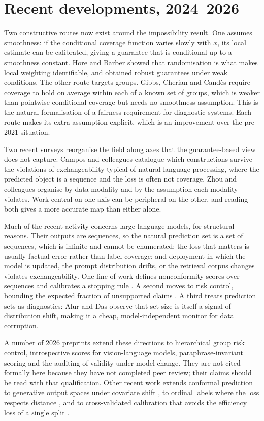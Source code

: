\section{Recent developments, 2024--2026}

Two constructive routes now exist around the impossibility result. One assumes
smoothness: if the conditional coverage function varies slowly with $x$, its local
estimate can be calibrated, giving a guarantee that is conditional up to a
smoothness constant. Hore and Barber \cite{Hore2024} showed that randomisation is
what makes local weighting identifiable, and obtained robust guarantees under weak
conditions. The other route targets groups. Gibbs, Cherian and Candès
\cite{Gibbs2025} require coverage to hold on average within each of a known set of
groups, which is weaker than pointwise conditional coverage but needs no
smoothness assumption. This is the natural formalisation of a fairness requirement
for diagnostic systems. Each route makes its extra assumption explicit, which is
an improvement over the pre-2021 situation.

Two recent surveys reorganise the field along axes that the guarantee-based view
does not capture. Campos and colleagues \cite{Campos2024} catalogue which
constructions survive the violations of exchangeability typical of natural
language processing, where the predicted object is a sequence and the loss is
often not coverage. Zhou and colleagues \cite{Zhou2025} organise by data modality
and by the assumption each modality violates. Work central on one axis can be
peripheral on the other, and reading both gives a more accurate map than either
alone.

Much of the recent activity concerns large language models, for structural reasons.
Their outputs are sequences, so the natural prediction set is a set of sequences,
which is infinite and cannot be enumerated; the loss that matters is usually
factual error rather than label coverage; and deployment in which the model is
updated, the prompt distribution drifts, or the retrieval corpus changes violates
exchangeability. One line of work defines nonconformity scores over sequences and
calibrates a stopping rule \cite{ConformalLM}. A second moves to risk control,
bounding the expected fraction of unsupported claims \cite{CRC}. A third treats
prediction sets as diagnostics: Alur and Das \cite{Alur2026} observe that set size
is itself a signal of distribution shift, making it a cheap, model-independent
monitor for data corruption.

A number of 2026 preprints extend these directions to hierarchical group risk
control, introspective scores for vision-language models, paraphrase-invariant
scoring and the auditing of validity under model change. They are not cited
formally here because they have not completed peer review; their claims should be
read with that qualification. Other recent work extends conformal prediction to
generative output spaces under covariate shift \cite{Li2026gen}, to ordinal labels
where the loss respects distance \cite{OrdinalCRC}, and to cross-validated
calibration that avoids the efficiency loss of a single split \cite{XVCrc}.


